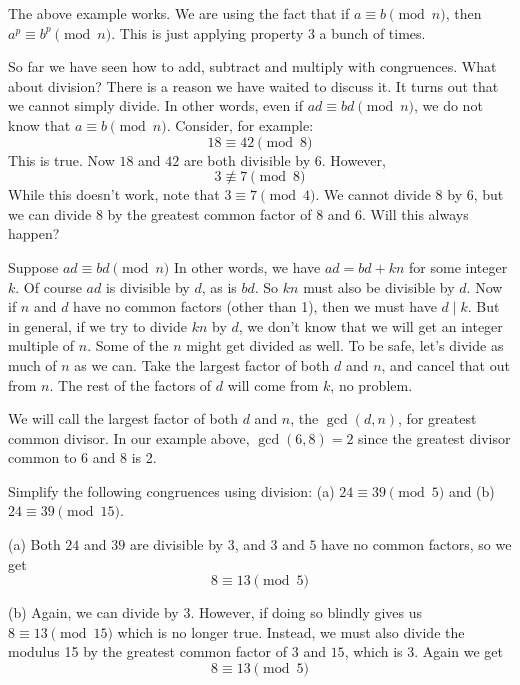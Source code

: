 \documentclass[12pt]{article}
\begin{document}
The above example works.  We are using the fact that if $a \equiv b \pmod n$, then $a^p \equiv b^p \pmod n$.  This is just applying property 3 a bunch of times.

So far we have seen how to add, subtract and multiply with congruences.  What about division?  There is a reason we have waited to discuss it.  It turns out that we cannot simply divide.  In other words, even if $ad \equiv bd \pmod n$, we do not know that $a \equiv b \pmod n$.  Consider, for example:
\[18 \equiv 42 \pmod 8\]
This is true.  Now $18$ and $42$ are both divisible by 6.  However,
\[3 \not\equiv 7 \pmod 8\]
While this doesn't work, note that $3 \equiv 7 \pmod 4$.  We cannot divide $8$ by 6, but we can divide 8 by the greatest common factor of $8$ and $6$.  Will this always happen?

Suppose $ad \equiv bd \pmod n$  In other words, we have $ad = bd + kn$ for some integer $k$.  Of course $ad$ is divisible by $d$, as is $bd$.  So $kn$ must also be divisible by $d$.  Now if $n$ and $d$ have no common factors (other than 1), then we must have $d \mid k$.  But in general, if we try to divide $kn$ by $d$, we don't know that we will get an integer multiple of $n$.  Some of the $n$ might get divided as well.  To be safe, let's divide as much of $n$ as we can.  Take the largest factor of both $d$ and $n$, and cancel that out from $n$.  The rest of the factors of $d$ will come from $k$, no problem.

We will call the largest factor of both $d$ and $n$, the $\gcd(d,n)$, for greatest common divisor.  In our example above, $\gcd(6,8) = 2$ since the greatest divisor common to 6 and 8 is 2.


\begin{example}
 Simplify the following congruences using division: (a) $24 \equiv 39 \pmod 5$ and (b) $24 \equiv 39 \pmod{15}$.
 
 \begin{solution}
	(a) Both $24$ and $39$ are divisible by $3$, and $3$ and $5$ have no common factors, so we get
	\[8 \equiv 13 \pmod 5\]
	
	(b) Again, we can divide by 3.  However, if doing so blindly gives us $8 \equiv 13 \pmod{15}$ which is no longer true.  Instead, we must also divide the modulus 15 by the greatest common factor of $3$ and $15$, which is $3$.  Again we get
	\[8 \equiv 13 \pmod 5\]
 \end{solution}
\end{example}
\end{document}
